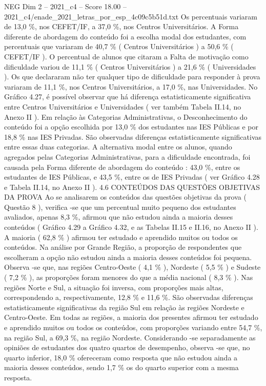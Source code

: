 \begin{textsample}{NEG Dim 2 – 2021\_c4 – Score 18.00 – 2021\_c4/enade\_2021\_letras\_por\_esp\_4c09c5b51d.txt}
Os percentuais variaram de 13,0 \%, nos CEFET/IF, a 37,0 \%, nos Centros Universitários.
A Forma diferente de abordagem do conteúdo foi a escolha modal dos estudantes, com percentuais que variaram de 40,7 \% ( Centros Universitários ) a 50,6 \% ( CEFET/IF ).
O percentual de alunos que citaram a Falta de motivação como dificuldade variou de 11,1 \% ( Centros Universitários ) a 21,6 \% ( Universidades ).
Os que declararam não ter qualquer tipo de dificuldade para responder à prova variaram de 11,1 \%, nos Centros Universitários, a 17,0 \%, nas Universidades.
No Gráfico 4.27, é possível observar que há diferença estatisticamente significativa entre Centros Universitários e Universidades ( ver também Tabela II.14, no Anexo II ).
Em relação às Categorias Administrativas, o Desconhecimento do conteúdo foi a opção escolhida por 13,0 \% dos estudantes nas IES Públicas e por 18,8 \% nas IES Privadas.
São observadas diferenças estatisticamente significativas entre essas duas categorias.
A alternativa modal entre os alunos, quando agregados pelas Categorias Administrativas, para a dificuldade encontrada, foi causada pela Forma diferente de abordagem do conteúdo : 43,0 \%, entre os estudantes de IES Públicas, e 43,5 \%, entre os de IES Privadas ( ver Gráfico 4.28 e Tabela II.14, no Anexo II ). 4.6 CONTEÚDOS DAS QUESTÕES OBJETIVAS DA PROVA Ao se analisarem os conteúdos das questões objetivas da prova ( Questão 8 ), verifica -se que um percentual muito pequeno dos estudantes avaliados, apenas 8,3 \%, afirmou que não estudou ainda a maioria desses conteúdos ( Gráfico 4.29 a Gráfico 4.32, e as Tabelas II.15 e II.16, no Anexo II ).
A maioria ( 62,8 \% ) afirmou ter estudado e aprendido muitos ou todos os conteúdos.
Na análise por Grande Região, a proporção de respondentes que escolheram a opção não estudou ainda a maioria desses conteúdos foi pequena.
Observa -se que, nas regiões Centro-Oeste ( 4,1 \% ), Nordeste ( 5,5 \% ) e Sudeste ( 7,2 \% ), as proporções foram menores do que a média nacional ( 8,3 \% ).
Nas regiões Norte e Sul, a situação foi inversa, com proporções mais altas, correspondendo a, respectivamente, 12,8 \% e 11,6 \%.
São observadas diferenças estatisticamente significativas da região Sul em relação às regiões Nordeste e Centro-Oeste.
Em todas as regiões, a maioria dos presentes afirmou ter estudado e aprendido muitos ou todos os conteúdos, com proporções variando entre 54,7 \%, na região Sul, a 69,3 \%, na região Nordeste.
Considerando -se separadamente as opiniões de estudantes dos quatro quartos de desempenho, observa -se que, no quarto inferior, 18,0 \% ofereceram como resposta que não estudou ainda a maioria desses conteúdos, sendo 1,7 \% os do quarto superior com a mesma resposta.

\end{textsample}
